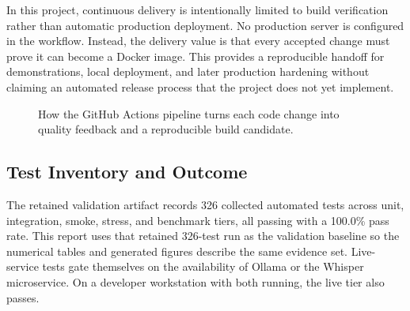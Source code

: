 In this project, continuous delivery is intentionally limited to build verification rather than automatic production deployment. No production server is configured in the workflow. Instead, the delivery value is that every accepted change must prove it can become a Docker image. This provides a reproducible handoff for demonstrations, local deployment, and later production hardening without claiming an automated release process that the project does not yet implement.

\begin{figure}[htbp]
\centering
{}
\caption{How the GitHub Actions pipeline turns each code change into quality feedback and a reproducible build candidate.}
\label{fig:cicd-pipeline}
\end{figure}
\FloatBarrier

\subsection{Test Inventory and Outcome}
\label{subsec:test-inventory-outcome}

The retained validation artifact records 326 collected automated tests across unit, integration, smoke, stress, and benchmark tiers, all passing with a 100.0\% pass rate. This report uses that retained 326-test run as the validation baseline so the numerical tables and generated figures describe the same evidence set. Live-service tests gate themselves on the availability of Ollama or the Whisper microservice. On a developer workstation with both running, the live tier also passes.

